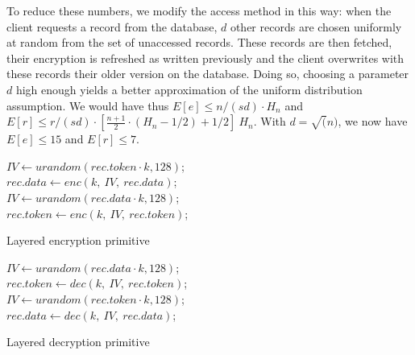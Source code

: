 \documentclass[USenglish,oneside,twocolumn]{article}
\begin{document}
To reduce these numbers, we modify the access method in this way: when the client requests a record from the database, $d$ other records are chosen uniformly at random from the set of unaccessed records. These records are then fetched, their encryption is refreshed as written previously and the client overwrites with these records their older version on the database. Doing so, choosing a parameter $d$ high enough yields a better approximation of the uniform distribution assumption. We would have thus $E[e]\leq n/(sd) \cdot H_n $ and $E[r] \leq{r/(sd)} \cdot \left [ \frac{n+1}{2}\cdot(H_n-1/2)+1/2 \right ] \ H_n$.
With $d=\sqrt(n)$, we now have $E[e]\leq 15$ and $E[r]\leq 7$.\\

\begin{algorithm}
\DontPrintSemicolon
{}
$IV \gets urandom(rec.token\cdot k, 128)$;\\
$rec.data \gets enc\left(k,\ IV,\ rec.data \right )$;\\
$IV \gets urandom(rec.data \cdot k, 128)$;\\
$rec.token \gets enc\left(k,\ IV,\ rec.token \right )$;\\
\caption{Layered encryption primitive}
\label{alg:lmix}
\end{algorithm}

\begin{algorithm}
\DontPrintSemicolon
{}
$IV \gets urandom(rec.data \cdot k, 128)$;\\
$rec.token \gets dec\left(k,\ IV,\ rec.token \right )$;\\
$IV \gets urandom(rec.token\cdot k, 128)$;\\
$rec.data \gets dec\left(k,\ IV,\ rec.data \right )$;\\
\caption{Layered decryption primitive}
\label{alg:lmix}
\end{algorithm}
\end{document}
